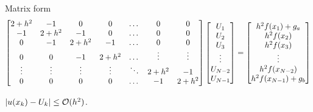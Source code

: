 \documentclass[]{article}
\begin{document}
Matrix form 
$$\begin{bmatrix}2+h^2 & -1 & 0 & 0 &\dots &0 & 0 \\ 
	-1 & 2+h^2 & -1 & 0 & \dots & 0 & 0 \\
	0 & -1 & 2+h^2 & -1 & \dots & 0 & 0 \\
	0 & 0 & -1 & 2+h^2 & \dots  & \vdots & \vdots \\
	\vdots & \vdots  & \vdots & \vdots & \ddots & 2+h^2 & -1 \\
0 & 0 & 0 & 0 & \dots & -1 & 2+h^2\end{bmatrix}\begin{bmatrix}U_1\\U_2\\U_3\\\vdots\\U_{N-2}\\U_{N-1}\end{bmatrix} = \begin{bmatrix}h^2f(x_1) + g_a \\ h^2f(x_2) \\ h^2f(x_3) \\ \vdots \\ h^2f(x_{N-2}) \\ h^2f(x_{N-1})+g_b\end{bmatrix} $$
\begin{fact}
	$|u(x_k)-U_k|\leq \mathcal{O}(h^2)$.
\end{fact}
\end{document}
